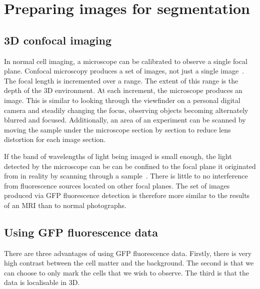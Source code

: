 
\chapter{Preparing images for segmentation}

\ifpdf
    \graphicspath{{Chapter3/Figs/Raster/}{Chapter3/Figs/PDF/}{Chapter3/Figs/}}
\else
    \graphicspath{{Chapter3/Figs/Vector/}{Chapter3/Figs/}}
\fi

\section{3D confocal imaging}

In normal cell imaging, a microscope can be calibrated to observe a single focal plane. Confocal microscopy produces a set of images, not just a single image~\cite{booth}. The focal length is incremented over a range. The extent of this range is the depth of the 3D environment. At each increment, the microscope produces an image. This is similar to looking through the viewfinder on a personal digital camera and steadily changing the focus, observing objects becoming alternately blurred and focused. Additionally, an area of an experiment can be scanned by moving the sample under the microscope section by section to reduce lens distortion for each image section.

If the band of wavelengths of light being imaged is small enough, the light detected by the microscope can be can be confined to the focal plane it originated from in reality by scanning through a sample~\cite{carlsson}. There is little to no interference from fluorescence sources located on other focal planes. The set of images produced via GFP fluorescence detection is therefore more similar to the results of an MRI than to normal photographs.

\section{Using GFP fluorescence data}

There are three advantages of using GFP fluorescence data. Firstly, there is very high contrast between the cell matter and the background. The second is that we can choose to only mark the cells that we wish to observe. The third is that the data is localisable in 3D.


